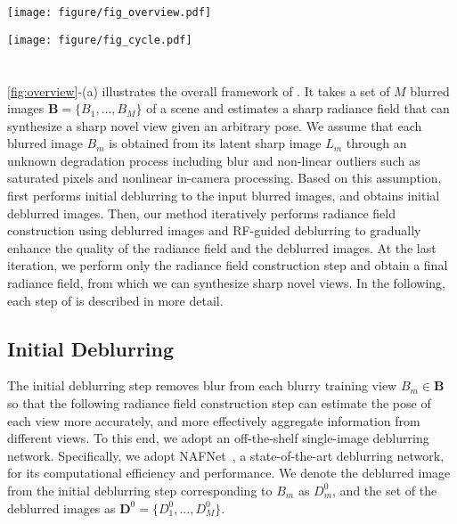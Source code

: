 \begin{figure*}
    \centering
    \texttt{[image: figure/fig\_overview.pdf]}
    \caption{Overall framework and intermediate result of each step of \MethodName{}.}
    \label{fig:overview}
    \vspace{-3mm}
\end{figure*}

\begin{figure*}[t]
    \centering
    \texttt{[image: figure/fig\_cycle.pdf]}
    \caption{As iterations progress, the rendered images contain increasingly high-quality scene information, which subsequently improves the RF-guided deblurring network's performance in the next iteration.}
    \label{fig:render_iterations}
    \vspace{-3mm}
\end{figure*}

\section{\MethodName{}}
\label{sec:deepdeblurrf}
\cref{fig:overview}-(a) illustrates the overall framework of \MethodName{}.
It takes a set of $M$ blurred images $\textbf{B} = \{B_1, ..., B_M\}$ of a scene and estimates a sharp radiance field that can synthesize a sharp novel view given an arbitrary pose.
We assume that each blurred image $B_m$ is obtained from its latent sharp image $L_m$ through an unknown degradation process including blur and non-linear outliers such as saturated pixels and nonlinear in-camera processing.
Based on this assumption, \MethodName{} first performs initial deblurring to the input blurred images, and obtains initial deblurred images. %
Then, our method iteratively performs radiance field construction using deblurred images and RF-guided deblurring to gradually enhance the quality of the radiance field and the deblurred images.
At the last iteration, we perform only the radiance field construction step and obtain a final radiance field, from which we can synthesize sharp novel views.
In the following, each step of \MethodName{} is described in more detail.

\subsection{Initial Deblurring}
The initial deblurring step removes blur from each blurry training view $B_m \in \textbf{B}$ so that the following radiance field construction step can estimate the pose of each view more accurately, and more effectively aggregate information from different views.
To this end, we adopt an off-the-shelf single-image deblurring network.
Specifically, we adopt NAFNet~\cite{chen2022nafnet}, a state-of-the-art deblurring network, for its computational efficiency and performance.
We denote the deblurred image from the initial deblurring step corresponding to $B_m$ as $D_m^0$, and the set of the deblurred images as $\textbf{D}^0 = \{D_1^0, ..., D_M^0\}$.


